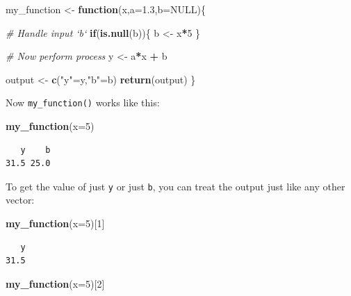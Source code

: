 \documentclass[
]{book}
\newenvironment{Shaded}{\begin{snugshade}}{\end{snugshade}}
\newcommand{\CommentTok}[1]{\textcolor[rgb]{0.56,0.35,0.01}{\textit{#1}}}
\newcommand{\ControlFlowTok}[1]{\textcolor[rgb]{0.13,0.29,0.53}{\textbf{#1}}}
\newcommand{\DataTypeTok}[1]{\textcolor[rgb]{0.13,0.29,0.53}{#1}}
\newcommand{\DecValTok}[1]{\textcolor[rgb]{0.00,0.00,0.81}{#1}}
\newcommand{\FloatTok}[1]{\textcolor[rgb]{0.00,0.00,0.81}{#1}}
\newcommand{\KeywordTok}[1]{\textcolor[rgb]{0.13,0.29,0.53}{\textbf{#1}}}
\newcommand{\NormalTok}[1]{#1}
\newcommand{\OperatorTok}[1]{\textcolor[rgb]{0.81,0.36,0.00}{\textbf{#1}}}
\newcommand{\OtherTok}[1]{\textcolor[rgb]{0.56,0.35,0.01}{#1}}
\newcommand{\StringTok}[1]{\textcolor[rgb]{0.31,0.60,0.02}{#1}}
\begin{document}
\begin{Shaded}
\begin{Highlighting}[]
\NormalTok{my_function <-}\StringTok{ }\ControlFlowTok{function}\NormalTok{(x,}\DataTypeTok{a=}\FloatTok{1.3}\NormalTok{,}\DataTypeTok{b=}\OtherTok{NULL}\NormalTok{)\{}
  
  \CommentTok{# Handle input `b`}
  \ControlFlowTok{if}\NormalTok{(}\KeywordTok{is.null}\NormalTok{(b))\{}
\NormalTok{    b <-}\StringTok{ }\NormalTok{x}\OperatorTok{*}\DecValTok{5}
\NormalTok{  \}}
  
  \CommentTok{# Now perform process}
\NormalTok{  y <-}\StringTok{ }\NormalTok{a}\OperatorTok{*}\NormalTok{x }\OperatorTok{+}\StringTok{ }\NormalTok{b}
  
\NormalTok{  output <-}\StringTok{ }\KeywordTok{c}\NormalTok{(}\StringTok{"y"}\NormalTok{=y,}\StringTok{"b"}\NormalTok{=b) }
  \KeywordTok{return}\NormalTok{(output)}
\NormalTok{\}}
\end{Highlighting}
\end{Shaded}

Now \texttt{my\_function()} works like this:

\begin{Shaded}
\begin{Highlighting}[]
\KeywordTok{my_function}\NormalTok{(}\DataTypeTok{x=}\DecValTok{5}\NormalTok{)}
\end{Highlighting}
\end{Shaded}

\begin{verbatim}
   y    b 
31.5 25.0 
\end{verbatim}

To get the value of just \texttt{y} or just \texttt{b}, you can treat the output just like any other vector:

\begin{Shaded}
\begin{Highlighting}[]
\KeywordTok{my_function}\NormalTok{(}\DataTypeTok{x=}\DecValTok{5}\NormalTok{)[}\DecValTok{1}\NormalTok{]}
\end{Highlighting}
\end{Shaded}

\begin{verbatim}
   y 
31.5 
\end{verbatim}

\begin{Shaded}
\begin{Highlighting}[]
\KeywordTok{my_function}\NormalTok{(}\DataTypeTok{x=}\DecValTok{5}\NormalTok{)[}\DecValTok{2}\NormalTok{]}
\end{Highlighting}
\end{Shaded}
\end{document}
